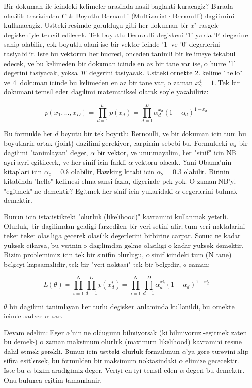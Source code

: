 \documentclass[12pt,fleqn]{article}\usepackage{../common}
\begin{document}
Bir dokuman ile icindeki kelimeler arasinda nasil baglanti kuracagiz?
Burada olasilik teorisinden Cok Boyutlu Bernoulli (Multivariate Bernoulli)
dagilimini kullanacagiz. Ustteki resimde goruldugu gibi her dokuman bir
$x^i$ rasgele degiskeniyle temsil edilecek. Tek boyutlu Bernoulli degiskeni
'1' ya da '0' degerine sahip olabilir, cok boyutlu olani ise bir vektor
icinde '1' ve '0' degerlerini tasiyabilir. Iste bu vektorun her hucresi,
onceden tanimli bir kelimeye tekabul edecek, ve bu kelimeden bir dokuman
icinde en az bir tane var ise, o hucre '1' degerini tasiyacak, yoksa '0'
degerini tasiyacak. Ustteki ornekte 2. kelime "hello" ve 4. dokuman
icinde bu kelimeden en az bir tane var, o zaman $x_2^4 = 1$. Tek bir
dokumani temsil eden dagilimi matematiksel olarak soyle yazabiliriz:

$$ p(x_1,...,x_{D}) = \prod_{d=1}^{D} p(x_d)=\prod_{d=1}^{D}
\alpha_d^{x_d}(1-\alpha_d)^{1-x_d} 
$$

Bu formulde her $d$ boyutu bir tek boyutlu Bernoulli, ve bir dokuman
icin tum bu boyutlarin ortak (joint) dagilimi gerekiyor, carpimin
sebebi bu. Formuldeki $\alpha_d$ bir dagilimi "tanimlayan" deger,
$\alpha$ bir vektor, ve unutmayalim, her "sinif" icin NB ayri ayri
egitilecek, ve her sinif icin farkli $\alpha$ vektoru olacak. Yani
Obama'nin kitaplari icin $\alpha_2 = 0.8$ olabilir, Hawking kitabi
icin $\alpha_2 = 0.3$ olabilir. Birinin kitabinda "hello" kelimesi
olma sansi fazla, digerinde pek yok. O zaman NB'yi "egitmek" ne
demektir? Egitmek her sinif icin yukaridaki $\alpha$ degerlerini
bulmak demektir.

Bunun icin istatistikteki "olurluk (likelihood)" kavramini kullanmak
yeterli. Olurluk, bir dagilimdan geldigi farzedilen bir veri setini
alir, tum veri noktalarini teker teker olasiliga gecerek olasilik
degerlerini birbirine carpar. Sonuc ne kadar yuksek cikarsa, bu
verinin o dagilimdan gelme olasiligi o kadar yuksek demektir. Bizim
problemimiz icin tek bir sinifin olurlugu, o sinif icindeki tum (N
tane) belgeyi kapsamalidir, tek bir "veri noktasi" tek bir belgedir,
o zaman:

$$ L(\theta) = \prod_{i=1}^N \prod_{d=1}^{D} p(x_d^i) = 
\prod_{i=1}^N \prod_{d=1}^{D} \alpha_d^{x_d^i}(1-\alpha_d)^{1-x_d^i}
 $$

$\theta$ bir dagilimi tanimlayan her turlu degisken anlaminda kullanildi, bu
ornekte icinde sadece $\alpha$ var.

Devam edelim: Eger $\alpha$'nin ne oldugunu bilmiyorsak (ki bilmiyoruz
-egitmek zaten bu demek-) o zaman maksimum olurluk (maximum likelihood)
kavramini resme dahil etmek gerekli. Bunun icin ustteki olurluk formulunun
$\alpha$'ya gore turevini alip sifira esitlersek, bu formulden bir maksimum
noktasindaki $\alpha$ elimize gececektir. Iste bu $\alpha$ bizim aradigimiz
deger. Veriyi en iyi temsil eden $\alpha$ degeri bu demektir. Onu bulunca
egitim tamamlanir.
\end{document}
